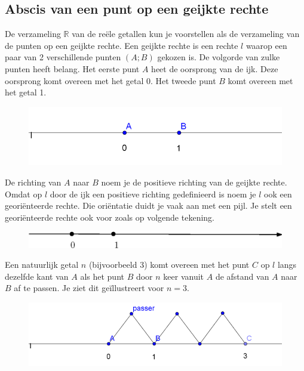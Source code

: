 \subsection{Abscis van een punt op een geijkte rechte}

De verzameling $\mathbb{R}$ van de re\"ele getallen kun je voorstellen als de verzameling van de punten op een geijkte rechte.
Een geijkte rechte is een rechte $l$ waarop een paar van 2 verschillende punten $(A;B)$ gekozen is.
De volgorde van zulke punten heeft belang.
Het eerste punt $A$ heet de oorsprong van de ijk.
Deze oorsprong komt overeen met het getal 0.
Het tweede punt $B$ komt overeen met het getal 1.

\begin{figure}[h]
\begin{center}
\includegraphics[height=2 cm]{4_opp_inhoud_an_meetk/inputs/AMTekst1Fig1}
\end{center}
\end{figure}

De richting van $A$ naar $B$ noem je de positieve richting van de geijkte rechte.
Omdat op $l$ door de ijk een positieve richting gedefinieerd is noem je $l$ ook een geori\"enteerde rechte.
Die ori\"entatie duidt je vaak aan met een pijl.
Je stelt een geori\"enteerde rechte ook voor zoals op volgende tekening.

\begin{figure}[h]
\begin{center}
\includegraphics[height=7 mm]{4_opp_inhoud_an_meetk/inputs/AMTekst1Fig2}
\end{center}
\end{figure}

Een natuurlijk getal $n$ (bijvoorbeeld 3) komt overeen met het punt $C$ op $l$ langs dezelfde kant van $A$ als het punt $B$ door $n$ keer vanuit $A$ de afstand van $A$ naar $B$ af te passen.
Je ziet dit ge\"illustreert voor $n=3$.

\begin{figure}[h]
\begin{center}
\includegraphics[height=2 cm]{4_opp_inhoud_an_meetk/inputs/AMTekst1Fig3}
\end{center}
\end{figure}

